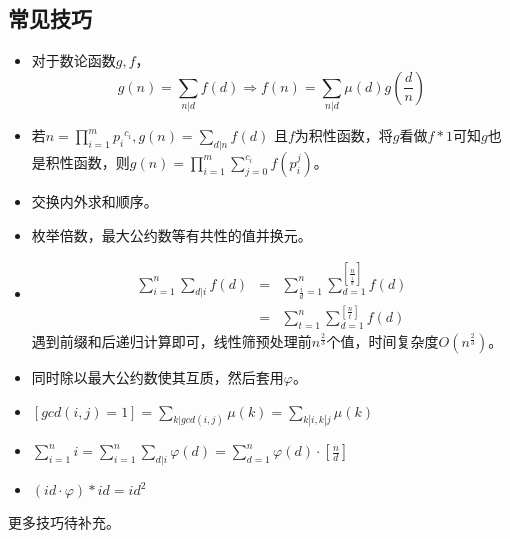 \subsection{常见技巧}
\begin{itemize}
	\item
	对于数论函数$g,f$，
	\begin{displaymath}
		g(n)=\sum_{n|d}{f(d)}\Rightarrow
		f(n)=\sum_{n|d}{\mu(d)g(\frac{d}{n})}
	\end{displaymath}
	\item
	若$\displaystyle n=\prod_{i=1}^m{{p_i}^{c_i}},g(n)=\sum_{d|n}{f(d)}$
	且$f$为积性函数，将$g$看做$f*1$可知$g$也是积性函数，则$g(n)=\prod_{i=1}^m
	{\sum_{j=0}^{c_i}{f(p_i^j)}}$。
	\item 交换内外求和顺序。
	\item 枚举倍数，最大公约数等有共性的值并换元。
	\item \begin{eqnarray*}
		\sum_{i=1}^n{\sum_{d|i}{f(d)}}&=&
		\sum_{\frac{i}{d}=1}^n{\sum_{d=1}^{[\frac{n}{\frac{i}{d}}]}{f(d)}}\\
		&=&\sum_{t=1}^n{\sum_{d=1}^{[\frac{n}{t}]}{f(d)}}
	\end{eqnarray*}
	遇到前缀和后递归计算即可，线性筛预处理前$n^\frac{2}{3}$个值，时间复杂度$O(n^\frac{2}{3})$。
	\item 同时除以最大公约数使其互质，然后套用$\varphi$。
	\item $\displaystyle [gcd(i,j)=1]=\sum_{k|gcd(i,j)}\mu(k)=
	\sum_{k|i,k|j}\mu(k)$
	\item $\displaystyle \sum_{i=1}^n{i}=
	\sum_{i=1}^n{\sum_{d|i}\varphi(d)}=
	\sum_{d=1}^n{\varphi(d)\cdot[\frac{n}{d}]}$
	\item $(id\cdot\varphi)*id=id^2$
\end{itemize}
更多技巧待补充。

